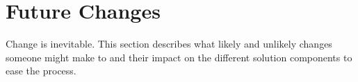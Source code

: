\section{Future Changes}\label{sec_Changes}

Change is inevitable. This section describes what likely and unlikely changes 
someone might make to \progname{} and their impact on the different solution 
components to ease the process.




